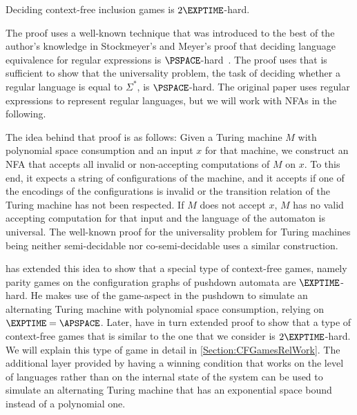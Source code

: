 \documentclass[../../diss.tex]{subfiles}
\begin{document}
\begin{theorem}%
\label{Theorem:CFGamesComplexityHardness}%
    Deciding context-free inclusion games is $2\EXPTIME$-hard.
\end{theorem}

The proof uses a well-known technique that was introduced to the best of the author's knowledge in Stockmeyer's and Meyer's proof that deciding language equivalence for regular expressions is $\PSPACE$-hard~\cite{StockmeyerM73}.
The proof uses that is sufficient to show that the universality problem, \ie the task of deciding whether a regular language is equal to $\Sigma^*$, is $\PSPACE$-hard.
The original paper uses regular expressions to represent regular languages, but we will work with NFAs in the following.

The idea behind that proof is as follows:
Given a Turing machine $M$ with polynomial space consumption and an input $x$ for that machine, we construct an NFA that accepts all invalid or non-accepting computations of $M$ on $x$.
To this end, it expects a string of configurations of the machine, and it accepts if one of the encodings of the configurations is invalid or the transition relation of the Turing machine has not been respected.
If $M$ does not accept $x$, $M$ has no valid accepting computation for that input and the language of the automaton is universal.
The well-known proof for the universality problem for Turing machines being neither semi-decidable nor co-semi-decidable uses a similar construction.

 has extended this idea to show that a special type of context-free games, namely parity games on the configuration graphs of pushdown automata are $\EXPTIME$-hard.
He makes use of the game-aspect in the pushdown to simulate an alternating Turing machine with polynomial space consumption, relying on $\EXPTIME = \APSPACE$.
Later,  have in turn extended \Walus proof to show that a type of context-free games that is similar to the one that we consider is $2\EXPTIME$-hard.
We will explain this type of game in detail in \cref{Section:CFGamesRelWork}.
The additional layer provided by having a winning condition that works on the level of languages rather than on the internal state of the system can be used to simulate an alternating Turing machine that has an exponential space bound instead of a polynomial one.
\end{document}
